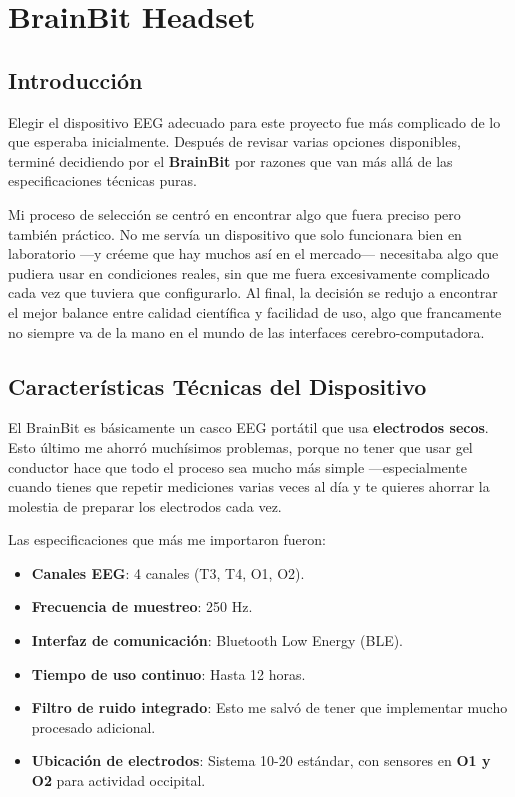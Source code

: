 \chapter{BrainBit Headset}

\section{Introducci\'on}
Elegir el dispositivo EEG adecuado para este proyecto fue más complicado de lo que esperaba inicialmente. Después de revisar varias opciones disponibles, terminé decidiendo por el \textbf{BrainBit} \cite{brainbit} por razones que van más allá de las especificaciones técnicas puras.

Mi proceso de selección se centró en encontrar algo que fuera preciso pero también práctico. No me servía un dispositivo que solo funcionara bien en laboratorio —y créeme que hay muchos así en el mercado— necesitaba algo que pudiera usar en condiciones reales, sin que me fuera excesivamente complicado cada vez que tuviera que configurarlo. Al final, la decisión se redujo a encontrar el mejor balance entre calidad científica y facilidad de uso, algo que francamente no siempre va de la mano en el mundo de las interfaces cerebro-computadora.

\section{Características Técnicas del Dispositivo}
El BrainBit es básicamente un casco EEG portátil que usa \textbf{electrodos secos}. Esto último me ahorró muchísimos problemas, porque no tener que usar gel conductor hace que todo el proceso sea mucho más simple —especialmente cuando tienes que repetir mediciones varias veces al día y te quieres ahorrar la molestia de preparar los electrodos cada vez.

Las especificaciones que más me importaron fueron:

    \begin{itemize}
        \item \textbf{Canales EEG}: 4 canales (T3, T4, O1, O2).
        \item \textbf{Frecuencia de muestreo}: 250 Hz.
        \item \textbf{Interfaz de comunicación}: Bluetooth Low Energy (BLE).
        \item \textbf{Tiempo de uso continuo}: Hasta 12 horas.
        \item \textbf{Filtro de ruido integrado}: Esto me salvó de tener que implementar mucho procesado adicional.
        \item \textbf{Ubicación de electrodos}: Sistema 10-20 estándar, con sensores en \textbf{O1 y O2} para actividad occipital.
    \end{itemize}

